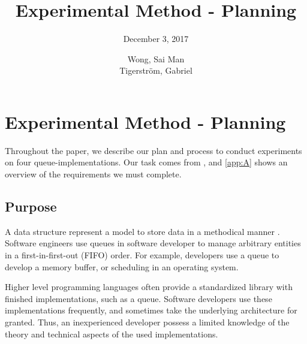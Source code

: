 \documentclass[a4paper,11pt]{kth-mag}
\title{Experimental Method - Planning}
\subtitle{December 3, 2017}
\author{Wong, Sai Man\\ Tigerstr\"{o}m, Gabriel}
\newcommand*{\skippara}{\par\vspace{\baselineskip} \noindent}
\begin{document}
\frontmatter
\pagestyle{empty}
\removepagenumbers
\maketitle
{}



{
      \hypersetup{linkcolor=black}
      \tableofcontents*
}
\mainmatter
\pagestyle{newchap}

\chapter{Experimental Method - Planning}
Throughout the paper, we describe our plan and process to conduct experiments on four queue-implementations.
Our task comes from \cite{Uppgiftl9:online}, and \cref{app:A} shows an overview of the requirements we must complete.

\section{Purpose}\label{sec:purpose}

A data structure represent a model to store data in a methodical manner \cite{deshpande2004c}.
Software engineers use queues in software developer to manage arbitrary entities in a first-in-first-out (FIFO) order.
For example, developers use a queue to develop a memory buffer, or scheduling in an operating system.

\skippara Higher level programming languages often provide a standardized library with finished implementations, such as a queue.
Software developers use these implementations frequently, and sometimes take the underlying architecture for granted.
Thus, an inexperienced developer possess a limited knowledge of the theory and technical aspects of the used implementations.
\end{document}
